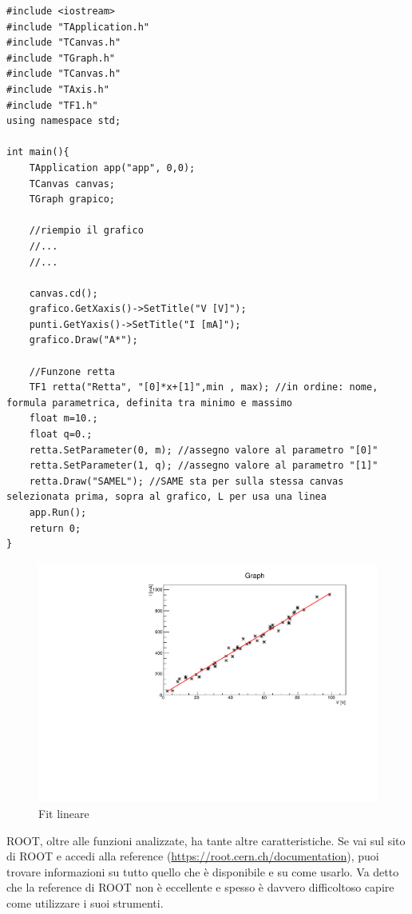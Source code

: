 \begin{lstlisting}[label=esroot2]
#include <iostream>
#include "TApplication.h"
#include "TCanvas.h"
#include "TGraph.h"
#include "TCanvas.h"
#include "TAxis.h"
#include "TF1.h"
using namespace std;

int main(){
	TApplication app("app", 0,0);
	TCanvas canvas;
	TGraph grapico;

	//riempio il grafico
	//...	
	//...

	canvas.cd();
	grafico.GetXaxis()->SetTitle("V [V]"); 
	punti.GetYaxis()->SetTitle("I [mA]"); 
	grafico.Draw("A*");

	//Funzone retta
	TF1 retta("Retta", "[0]*x+[1]",min , max); //in ordine: nome, formula parametrica, definita tra minimo e massimo
	float m=10.;
	float q=0.;	
	retta.SetParameter(0, m); //assegno valore al parametro "[0]" 
	retta.SetParameter(1, q); //assegno valore al parametro "[1]"
	retta.Draw("SAMEL"); //SAME sta per sulla stessa canvas selezionata prima, sopra al grafico, L per usa una linea
	app.Run();
	return 0;
}
\end{lstlisting}
\begin{figure} [ht]
	\centering
	\includegraphics[scale=\scaledim]{Immagini/retta.pdf}  
	\caption{Fit lineare}
	\label{root6}
\end{figure}



ROOT, oltre alle funzioni analizzate, ha tante altre caratteristiche. Se vai sul sito di ROOT  e accedi alla reference (\url{https://root.cern.ch/documentation}), puoi trovare informazioni su tutto quello che è disponibile e su come usarlo. Va detto che la reference di ROOT non è eccellente e spesso è davvero difficoltoso capire come utilizzare i suoi strumenti.
